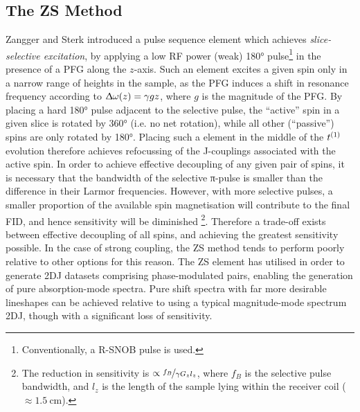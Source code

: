 \subsection{The \acl{ZS} Method}
\label{subsec:ZS}
Zangger and Sterk introduced a pulse sequence element which achieves
\emph{slice-selective excitation}, by applying a low \ac{RF} power (weak) \ang{180}
pulse\footnote{Conventionally, a R-SNOB pulse is used\cite{Kupce1995}.} in the
presence of a \ac{PFG} along the $z$-axis\cite{Zangger1997}. Such an element
excites a
given spin only in a narrow range of heights in the sample, as the \ac{PFG}
induces a shift in resonance frequency according to $\Updelta \omega(z) = \gamma
gz$, where $g$ is the magnitude of the \ac{PFG}. By placing a hard
\ang{180} pulse adjacent to the selective pulse, the
``active'' spin in a given slice is rotated by \ang{360} (i.e. no net
rotation), while all other (``passive'') spins are only rotated by \ang{180}.
Placing such a element in the middle of the $t^{(1)}$ evolution therefore
achieves refocussing of the J-couplings associated with the active
spin\cite{Aguilar2010}. In order to achieve effective decoupling of any given
pair of spins, it is necessary that the bandwidth of the selective π-pulse is
smaller than the difference in their Larmor frequencies. However, with more
selective pulses, a smaller proportion of the available spin magnetisation will
contribute to the final FID, and hence sensitivity will be diminished
\footnote{
    The reduction in sensitivity is $\propto \nicefrac{f_B}{\gamma G_z l_z}$,
    where $f_B$ is the selective pulse bandwidth, and $l_z$ is the length of
    the sample lying within the receiver coil ($\approx
    \qty{1.5}{\centi\meter}$).
}.
Therefore a trade-off exists between effective decoupling of all spins, and
achieving the greatest sensitivity possible. In the case of strong coupling,
the \ac{ZS} method tends to perform poorly relative to other options for this
reason. The \ac{ZS} element has utilised in order to generate \ac{2DJ} datasets
comprising phase-modulated pairs, enabling the generation of pure
absorption-mode spectra\cite{Pell2007}. Pure shift spectra with far more
desirable lineshapes can be achieved relative to using a typical magnitude-mode
spectrum \ac{2DJ}, though with a significant loss of sensitivity.

